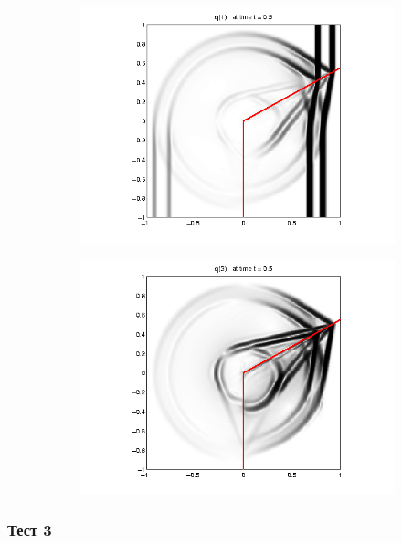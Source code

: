 \documentclass{article}
\begin{document}
\begin{figure}[h] 
    \begin{subfigure}{0.5\textwidth}
    \includegraphics[width=1\linewidth]{2D_seismic_tests/corner-sigma11.png} 
    \end{subfigure}
    \begin{subfigure}{0.5\textwidth}
    \includegraphics[width=1\linewidth]{2D_seismic_tests/corner-sigma12.png}
    \end{subfigure}
\end{figure}

\newpage
\subsubsection{Тест 3}
\end{document}
